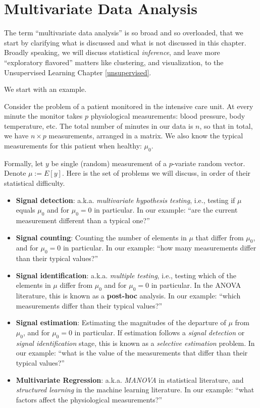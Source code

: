 \documentclass[]{book}
\theoremstyle{definition}
\theoremstyle{definition}
\theoremstyle{definition}
\theoremstyle{remark}
\let\BeginKnitrBlock\begin \let\EndKnitrBlock\end
\begin{document}
\hypertarget{multivariate}{%
\chapter{Multivariate Data Analysis}\label{multivariate}}

The term ``multivariate data analysis'' is so broad and so overloaded, that we start by clarifying what is discussed and what is not discussed in this chapter.
Broadly speaking, we will discuss statistical \emph{inference}, and leave more ``exploratory flavored'' matters like clustering, and visualization, to the Unsupervised Learning Chapter \ref{unsupervised}.

We start with an example.

\BeginKnitrBlock{example}
\protect\hypertarget{exm:icu}{}{\label{exm:icu} }Consider the problem of a patient monitored in the intensive care unit.
At every minute the monitor takes \(p\) physiological measurements: blood pressure, body temperature, etc.
The total number of minutes in our data is \(n\), so that in total, we have \(n \times p\) measurements, arranged in a matrix.
We also know the typical measurements for this patient when healthy: \(\mu_0\).
\EndKnitrBlock{example}

Formally, let \(y\) be single (random) measurement of a \(p\)-variate random vector.
Denote \(\mu:=E[y]\).
Here is the set of problems we will discuss, in order of their statistical difficulty.

\begin{itemize}
\item
  \textbf{Signal detection}:
  a.k.a. \emph{multivariate hypothesis testing}, i.e., testing if \(\mu\) equals \(\mu_0\) and for \(\mu_0=0\) in particular.
  In our example: ``are the current measurement different than a typical one?''
\item
  \textbf{Signal counting}:
  Counting the number of elements in \(\mu\) that differ from \(\mu_0\), and for \(\mu_0=0\) in particular.
  In our example: ``how many measurements differ than their typical values?''
\item
  \textbf{Signal identification}:
  a.k.a. \emph{multiple testing}, i.e., testing which of the elements in \(\mu\) differ from \(\mu_0\) and for \(\mu_0=0\) in particular.
  In the ANOVA literature, this is known as a \textbf{post-hoc} analysis.
  In our example: ``which measurements differ than their typical values?''
\item
  \textbf{Signal estimation}:
  Estimating the magnitudes of the departure of \(\mu\) from \(\mu_0\), and for \(\mu_0=0\) in particular.
  If estimation follows a \emph{signal detection} or \emph{signal identification} stage, this is known as a \emph{selective estimation} problem.
  In our example: ``what is the value of the measurements that differ than their typical values?''
\item
  \textbf{Multivariate Regression}:
  a.k.a. \emph{MANOVA} in statistical literature, and \emph{structured learning} in the machine learning literature.
  In our example: ``what factors affect the physiological measurements?''
\end{itemize}
\end{document}
